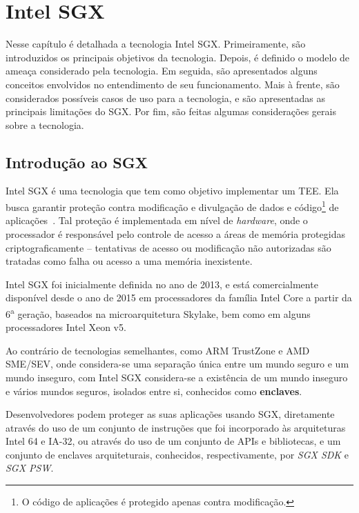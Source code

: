 \chapter{Intel SGX}
\label{chapter:sgx}

Nesse capítulo é detalhada a tecnologia Intel SGX. Primeiramente, são
introduzidos os principais objetivos da tecnologia. Depois, é definido o modelo
de ameaça considerado pela tecnologia. Em seguida, são apresentados alguns
conceitos envolvidos no entendimento de seu funcionamento. Mais à frente, são
considerados possíveis casos de uso para a tecnologia, e são apresentadas as
principais limitações do SGX. Por fim, são feitas algumas considerações gerais
sobre a tecnologia.

\section{Introdução ao SGX}
\label{sec:sgx_intro}

Intel SGX é uma tecnologia que tem como objetivo implementar um TEE. Ela busca
garantir proteção contra modificação e divulgação de dados e código\footnote{O
código de aplicações é protegido apenas contra modificação.} de aplicações~\cite
{mckeen2013innovative}. Tal proteção é implementada em nível de \textit
{hardware}, onde o processador é responsável pelo controle de acesso a áreas de
memória protegidas criptograficamente -- tentativas de acesso ou modificação não
autorizadas são tratadas como falha ou acesso a uma memória inexistente.

Intel SGX foi inicialmente definida no ano de 2013, e está comercialmente
disponível desde o ano de 2015 em processadores da família Intel Core a partir
da 6\textsuperscript{a} geração, baseados na microarquitetura Skylake, bem como
em alguns processadores Intel Xeon v5.

Ao contrário de tecnologias semelhantes, como ARM TrustZone e AMD SME/SEV, onde
considera-se uma separação única entre um mundo seguro e um mundo inseguro, com
Intel SGX considera-se a existência de um mundo inseguro e vários mundos
seguros, isolados entre si, conhecidos como \textbf{enclaves}.

Desenvolvedores podem proteger as suas aplicações usando SGX, diretamente
através do uso de um conjunto de instruções que foi incorporado às arquiteturas
Intel 64 e IA-32, ou através do uso de um conjunto de APIs e bibliotecas, e um
conjunto de enclaves arquiteturais, conhecidos, respectivamente, por \textit{SGX
SDK} e \textit{SGX PSW}.

